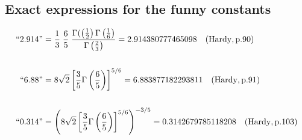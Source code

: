 \documentclass[11pt, oneside]{article}   	%
\begin{document}
\begin{appendix}
\subsection{Exact expressions for the funny constants\cite{Hardy1998}}
\label{append:funny}

\begin{align}
``2.914"&= \frac{1}{3}\;\frac{6}{5}\;
\frac {\Gamma(\left(\frac{1}{2}\right) \Gamma\left(\frac{1}{6}\right)} {\Gamma\left(\frac{2}{3}\right) }
= 2.914380777465098  \quad {\rm (Hardy, p.90)}\\
&\quad \nonumber \\
``6.88" &= 8 \sqrt{2} \left[ \frac{3}{5}\Gamma\left(\frac{6}{5}\right)\right ]^{5/6} = 6.883877182293811 \quad {\rm (Hardy, p.91)} \\
&\quad \nonumber \\
``0.314" &= \left (8 \sqrt{2} \left[ \frac{3}{5}\Gamma\left(\frac{6}{5}\right)\right ]^{5/6}\right)^{-3/5} = 0.3142679785118208 \quad {\rm (Hardy, p. 103)}
\end{align}

\end{appendix}
\end{document}
